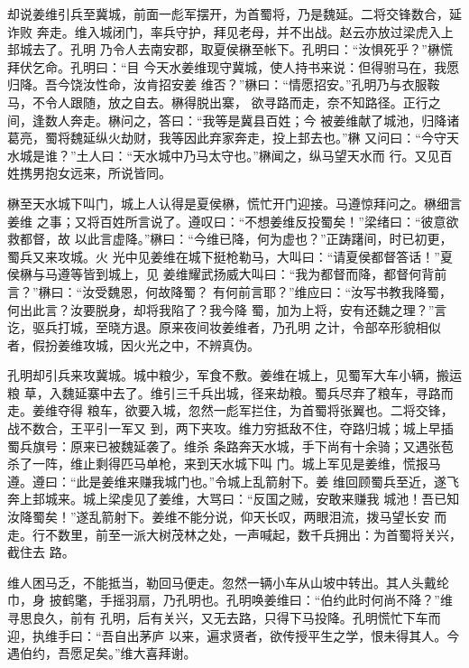 却说姜维引兵至冀城，前面一彪军摆开，为首蜀将，乃是魏延。二将交锋数合，延诈败
奔走。维入城闭门，率兵守护，拜见老母，并不出战。赵云亦放过梁虎入上邽城去了。孔明
乃令人去南安郡，取夏侯楙至帐下。孔明曰：“汝惧死乎？”楙慌拜伏乞命。孔明曰：“目
今天水姜维现守冀城，使人持书来说：但得驸马在，我愿归降。吾今饶汝性命，汝肯招安姜
维否？”楙曰：“情愿招安。”孔明乃与衣服鞍马，不令人跟随，放之自去。楙得脱出寨，
欲寻路而走，奈不知路径。正行之间，逢数人奔走。楙问之，答曰：“我等是冀县百姓；今
被姜维献了城池，归降诸葛亮，蜀将魏延纵火劫财，我等因此弃家奔走，投上邽去也。”楙
又问曰：“今守天水城是谁？”土人曰：“天水城中乃马太守也。”楙闻之，纵马望天水而
行。又见百姓携男抱女远来，所说皆同。

楙至天水城下叫门，城上人认得是夏侯楙，慌忙开门迎接。马遵惊拜问之。楙细言姜维
之事；又将百姓所言说了。遵叹曰：“不想姜维反投蜀矣！”梁绪曰：“彼意欲救都督，故
以此言虚降。”楙曰：“今维已降，何为虚也？”正踌躇间，时已初更，蜀兵又来攻城。火
光中见姜维在城下挺枪勒马，大叫曰：“请夏侯都督答话！”夏侯楙与马遵等皆到城上，见
姜维耀武扬威大叫曰：“我为都督而降，都督何背前言？”楙曰：“汝受魏恩，何故降蜀？
有何前言耶？”维应曰：“汝写书教我降蜀，何出此言？汝要脱身，却将我陷了？我今降
蜀，加为上将，安有还魏之理？”言讫，驱兵打城，至晓方退。原来夜间妆姜维者，乃孔明
之计，令部卒形貌相似者，假扮姜维攻城，因火光之中，不辨真伪。

孔明却引兵来攻冀城。城中粮少，军食不敷。姜维在城上，见蜀军大车小辆，搬运粮
草，入魏延寨中去了。维引三千兵出城，径来劫粮。蜀兵尽弃了粮车，寻路而走。姜维夺得
粮车，欲要入城，忽然一彪军拦住，为首蜀将张翼也。二将交锋，战不数合，王平引一军又
到，两下夹攻。维力穷抵敌不住，夺路归城；城上早插蜀兵旗号：原来已被魏延袭了。维杀
条路奔天水城，手下尚有十余骑；又遇张苞杀了一阵，维止剩得匹马单枪，来到天水城下叫
门。城上军见是姜维，慌报马遵。遵曰：“此是姜维来赚我城门也。”令城上乱箭射下。姜
维回顾蜀兵至近，遂飞奔上邽城来。城上梁虔见了姜维，大骂曰：“反国之贼，安敢来赚我
城池！吾已知汝降蜀矣！”遂乱箭射下。姜维不能分说，仰天长叹，两眼泪流，拨马望长安
而走。行不数里，前至一派大树茂林之处，一声喊起，数千兵拥出：为首蜀将关兴，截住去
路。

维人困马乏，不能抵当，勒回马便走。忽然一辆小车从山坡中转出。其人头戴纶巾，身
披鹤氅，手摇羽扇，乃孔明也。孔明唤姜维曰：“伯约此时何尚不降？”维寻思良久，前有
孔明，后有关兴，又无去路，只得下马投降。孔明慌忙下车而迎，执维手曰：“吾自出茅庐
以来，遍求贤者，欲传授平生之学，恨未得其人。今遇伯约，吾愿足矣。”维大喜拜谢。

